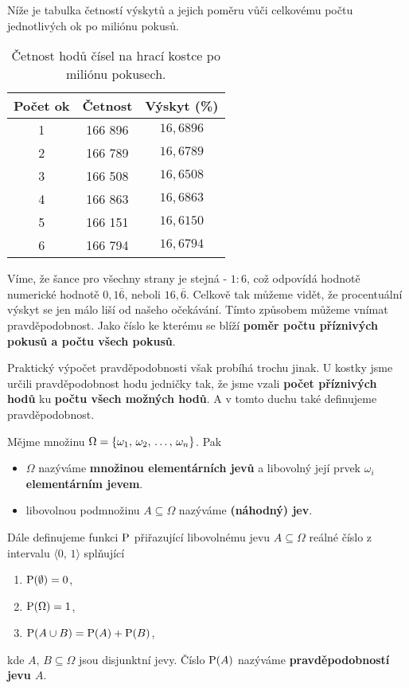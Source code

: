 Níže je tabulka četností výskytů a jejich poměru vůči celkovému počtu jednotlivých ok po miliónu pokusů.
\begin{table}[H]
    \centering
    \begin{tabular}{|c|c|c|}
    \hline
    Počet ok & Četnost & Výskyt (\%)     \\ \hline
    1     & 166 896 & $16{,}6896$ \\
    2     & 166 789 & $16{,}6789$ \\
    3     & 166 508 & $16{,}6508$ \\
    4     & 166 863 & $16{,}6863$ \\
    5     & 166 151 & $16{,}6150$ \\
    6     & 166 794 & $16{,}6794$ \\ \hline
    \end{tabular}
    \caption {Četnost hodů čísel na hrací kostce po miliónu pokusech.}
\end{table}
Víme, že šance pro všechny strany je stejná - $1:6$, což odpovídá hodnotě numerické hodnotě $0{,}1\overline{6}$, neboli $16{,}\overline{6}$. Celkově tak můžeme vidět, že procentuální výskyt se jen málo liší od našeho očekávání. Tímto způsobem můžeme vnímat pravděpodobnost. Jako číslo ke kterému se blíží \textbf{poměr počtu příznivých pokusů a počtu všech pokusů}.\par
Praktický výpočet pravděpodobnosti však probíhá trochu jinak. U kostky jsme určili pravděpodobnost hodu jedničky tak, že jsme vzali \textbf{počet příznivých hodů} ku \textbf{počtu všech možných hodů}. A v tomto duchu také definujeme pravděpodobnost.\par
\begin{definition}\label{def:elementarni_nahodny_jev_pravdepodobnost}
    Mějme množinu $\Omega=\left\{\omega_1,\,\omega_2,\,\dots,\,\omega_n\right\}$. Pak
    \begin{itemize}
        \item $\Omega$ nazýváme \textbf{množinou elementárních jevů} a libovolný její prvek $\omega_i$ \textbf{elementárním jevem}.
        \item libovolnou podmnožinu $A\subseteq\Omega$ nazýváme \textbf{(náhodný) jev}.
    \end{itemize}
    Dále definujeme funkci $\operatorname{P}$ přiřazující libovolnému jevu $A\subseteq\Omega$ reálné číslo z intervalu $\langle0,\,1\rangle$ splňující
    \begin{enumerate}[label=(\roman*)]
        \item $\operatorname{P}(\emptyset)=0$,
        \item $\operatorname{P}(\Omega)=1$,
        \item $\operatorname{P}(A\cup B)=\operatorname{P}(A)+\operatorname{P}(B)$,
    \end{enumerate}
    kde $A,\,B\subseteq\Omega$ jsou disjunktní jevy. Číslo $\operatorname{P}(A)$ nazýváme \textbf{pravděpodobností jevu $A$}.
\end{definition}

